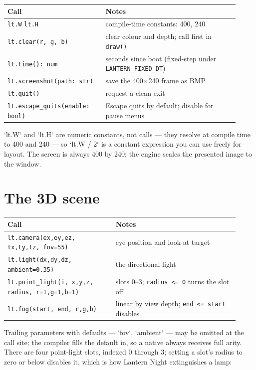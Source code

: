 \begin{center}
\small\begin{tabular}{@{}p{0.39\linewidth}p{0.53\linewidth}@{}}
\toprule
\textbf{Call} & \textbf{Notes} \\
\midrule
\texttt{lt.W} \enskip \texttt{lt.H} & compile-time constants: 400, 240 \\
\texttt{lt.clear(r, g, b)} & clear colour and depth; call first in \texttt{draw()} \\
\texttt{lt.time(): num} & seconds since boot (fixed-step under \texttt{LANTERN\_FIXED\_DT}) \\
\texttt{lt.screenshot(path: str)} & save the 400$\times$240 frame as BMP \\
\texttt{lt.quit()} & request a clean exit \\
\texttt{lt.escape\_quits(enable: bool)} & Escape quits by default; disable for pause menus \\
\bottomrule
\end{tabular}
\end{center}

\noindent
`lt.W` and `lt.H` are numeric constants, not calls --- they resolve at compile
time to 400 and 240 --- so `lt.W / 2` is a constant expression you can use
freely for layout. The screen is always 400 by 240; the engine scales the
presented image to the window.

\section{The 3D scene}

\begin{center}
\small\begin{tabular}{@{}p{0.43\linewidth}p{0.49\linewidth}@{}}
\toprule
\textbf{Call} & \textbf{Notes} \\
\midrule
\texttt{lt.camera(ex,ey,ez, tx,ty,tz, fov=55)} & eye position and look-at target \\
\texttt{lt.light(dx,dy,dz, ambient=0.35)} & the directional light \\
\texttt{lt.point\_light(i, x,y,z, radius, r=1,g=1,b=1)} & slots 0--3; \texttt{radius <= 0} turns the slot off \\
\texttt{lt.fog(start, end, r,g,b)} & linear by view depth; \texttt{end <= start} disables \\
\bottomrule
\end{tabular}
\end{center}

\noindent
Trailing parameters with defaults --- `fov`, `ambient` --- may be omitted at the
call site; the compiler fills the default in, so a native always receives full
arity. There are four point-light slots, indexed 0 through 3; setting a slot's
radius to zero or below disables it, which is how Lantern Night extinguishes a
lamp:

